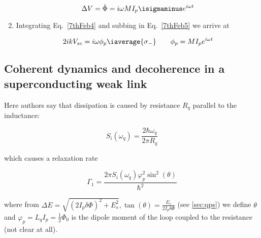 \begin{enumerate}
  \begin{equation}\label{7thFeb5}
    \Delta V = \dot{\Phi} = i\omega MI_p\isigmaminus e^{i\omega t}
  \end{equation}

\item     Integrating    Eq.~\eqref{7thFeb4}     and    subbing     in
  Eq.~\eqref{7thFeb5} we arrive at

  \begin{equation}\label{7thFev5}
    2ikV_{sc} = i\omega\phi_p\iaverage{\sigma_{-}}\qquad \phi_p = MI_pe^{i\omega t}
  \end{equation}

\end{enumerate}

\subsection{Coherent  dynamics and  decoherence  in a  superconducting
  weak link \cite{Peltonen_2016}}
\label{sec:coher-dynam-decoh}

Here  authors say  that dissipation  is caused  by resistance  $R_{q}$
parallel to the inductance:

\begin{equation}
  S_{i}(\omega_{q}) = \frac{2\hbar\omega_q}{2\pi R_q}
\end{equation}

\noindent which causes a relaxation rate

\begin{equation}
  \Gamma_1 = \frac{2\pi S_i(\omega_q) \varphi_p^2\sin^2\left( \theta \right)}{\hbar^2}
\end{equation}

\noindent                          where                          from
$\Delta    E    =     \sqrt{(2I_p\delta\Phi)^2+E_s^2},    \tan(\theta)    =
\frac{E_s}{2I_p\delta\Phi}$ (see \autoref{sec:qps}) we define $\theta$
and $\varphi_p = L_{q}I_p = \frac{1}{2}\Phi_0$ is the dipole moment of
the loop coupled to the resistance (not clear at all).


